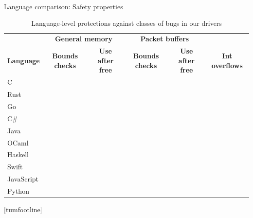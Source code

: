 \documentclass[NET,english,aspectratio=169,notitleframe]{tumbeamer}
\newcommand{\xmark}{\textcolor{TUMDarkRed}{\ding{55}}}%
\begin{document}
\begin{frame}{Language comparison: Safety properties}
\begin{table}[t]
 \setlength{\tabcolsep}{1.3mm}
	\centering
	\footnotesize
	\begin{tabular}{lccccc}
		& \multicolumn{2}{c}{\textbf{General memory}} & \multicolumn{2}{c}{\hspace{-1em}\textbf{Packet buffers}}  \\
		\textbf{Language} & \textbf{Bounds checks} & \textbf{Use after free}  & \textbf{Bounds checks} & \textbf{Use after free} & \textbf{Int overflows} \\
		\toprule
		C & \xmark & \xmark & \xmark & \xmark & \xmark \\
		Rust & &  &  &  &  \\
		Go  & &  &  &  &  \\
		C\#  & &  &  &  &  \\
		Java & & & & & \\
		OCaml  & &  &  &  &  \\
		Haskell  & &  &  &  &  \\
		Swift  & &  &  &  &  \\
		JavaScript & & & & & \\
		Python  & &  &  &  &  \\
		\bottomrule
	\end{tabular}
	\caption{Language-level protections against classes of bugs in our drivers}
	\label{tbl:lang-safety}
	\vspace{-3em}
\end{table}
\end{frame}
[tumfootline]
\end{document}
